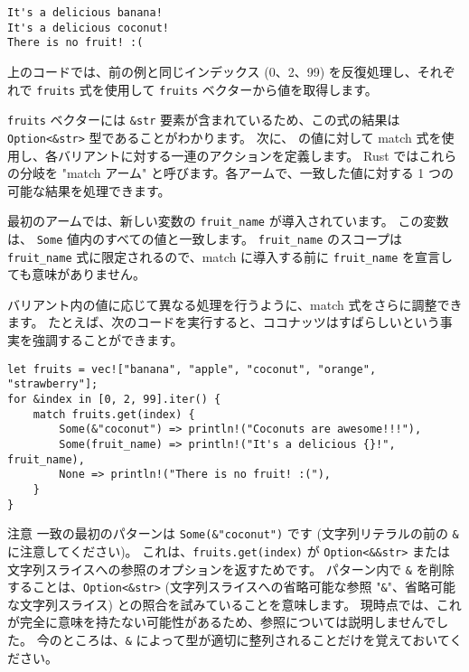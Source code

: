 \begin{lstlisting}[numbers=none]
It's a delicious banana!
It's a delicious coconut!
There is no fruit! :(
\end{lstlisting}

上のコードでは、前の例と同じインデックス (0、2、99) を反復処理し、それぞれで \texttt{fruits} 式を使用して \texttt{fruits} ベクターから値を取得します。

\texttt{fruits} ベクターには \texttt{\&str} 要素が含まれているため、この式の結果は \texttt{Option<\&str>} 型であることがわかります。 次に、 の値に対して match 式を使用し、各バリアントに対する一連のアクションを定義します。 Rust ではこれらの分岐を "match アーム" と呼びます。各アームで、一致した値に対する 1 つの可能な結果を処理できます。

最初のアームでは、新しい変数の \texttt{fruit\_name} が導入されています。 この変数は、 \texttt{Some} 値内のすべての値と一致します。 \texttt{fruit\_name} のスコープは \texttt{fruit\_name} 式に限定されるので、match に導入する前に \texttt{fruit\_name} を宣言しても意味がありません。

バリアント内の値に応じて異なる処理を行うように、match 式をさらに調整できます。 たとえば、次のコードを実行すると、ココナッツはすばらしいという事実を強調することができます。

\begin{lstlisting}[numbers=none]
let fruits = vec!["banana", "apple", "coconut", "orange", "strawberry"];
for &index in [0, 2, 99].iter() {
    match fruits.get(index) {
        Some(&"coconut") => println!("Coconuts are awesome!!!"),
        Some(fruit_name) => println!("It's a delicious {}!", fruit_name),
        None => println!("There is no fruit! :("),
    }
}
\end{lstlisting}

\begin{itembox}[l]{注意}
一致の最初のパターンは \texttt{Some(\&"coconut")} です (文字列リテラルの前の \texttt{\&} に注意してください)。 これは、\texttt{fruits.get(index)} が \texttt{Option<\&\&str>} または文字列スライスへの参照のオプションを返すためです。 パターン内で \texttt{\&} を削除することは、\texttt{Option<\&str>} (文字列スライスへの省略可能な参照 "\texttt{\&}"、省略可能な文字列スライス) との照合を試みていることを意味します。 現時点では、これが完全に意味を持たない可能性があるため、参照については説明しませんでした。 今のところは、\texttt{\&} によって型が適切に整列されることだけを覚えておいてください。
\end{itembox}

